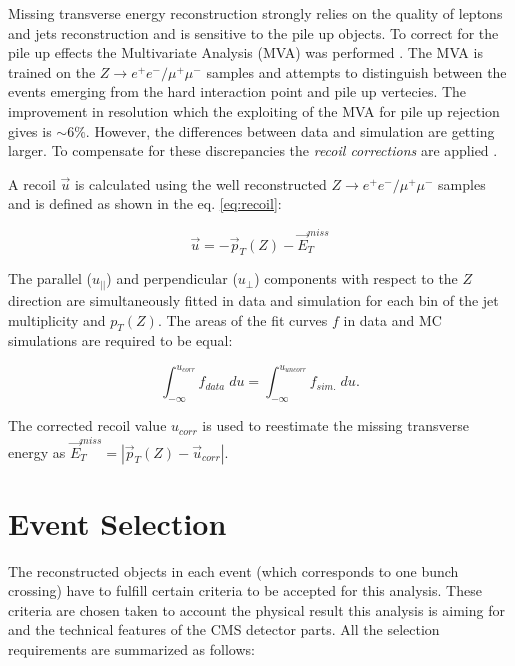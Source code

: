 Missing transverse energy reconstruction strongly relies on the quality of leptons and jets reconstruction and is sensitive to the pile up objects. To correct for the 
pile up effects the Multivariate Analysis (MVA) was performed \cite{CMS-PAS-JME-12-002}.
The MVA is trained on the $Z \to e^{+}e^{-} / \mu^{+}\mu^{-}$ samples and attempts to distinguish between the events emerging from the hard interaction point and
pile up vertecies. The improvement in resolution which the exploiting of the MVA for pile up rejection gives is $\sim 6\%$. However, the differences between data
and simulation are getting larger. To compensate for these discrepancies the \textit{recoil corrections} are applied \cite{CMS-PAS-JME-12-002}. 

A recoil $\vec{u}$ is calculated using the well reconstructed $Z \to e^{+}e^{-} / \mu^{+}\mu^{-}$ samples and is defined as shown in the eq. \ref{eq:recoil}:

\begin{equation}
 \vec{u} = - \vec{p}_{T}(Z) - \vec{E}_{T}^{miss}
\end{equation}

The parallel ($u_{||}$) and perpendicular ($u_{\perp}$) components with respect to the $Z$ direction are simultaneously fitted in data and simulation for each bin
of the jet multiplicity and $p_{T}(Z)$. The areas of the fit curves $f$ in data and MC simulations are required to be equal:

\begin{equation}
 \int_{-\infty}^{u_{corr}} f_{data}\; du = \int_{-\infty}^{u_{uncorr}} f_{sim.}\; du.
\end{equation}

The corrected recoil value $u_{corr}$ is used to reestimate the missing transverse energy as $\vec{E}_{T}^{miss} = | \vec{p}_{T}(Z) - \vec{u}_{corr} |$.

\section{Event Selection}

The reconstructed objects in each event (which corresponds to one bunch crossing) have to fulfill certain criteria to be accepted for this analysis. These 
criteria are chosen taken to account the physical result this analysis is aiming for and the technical features of the CMS detector parts.
All the selection requirements are summarized as follows:


